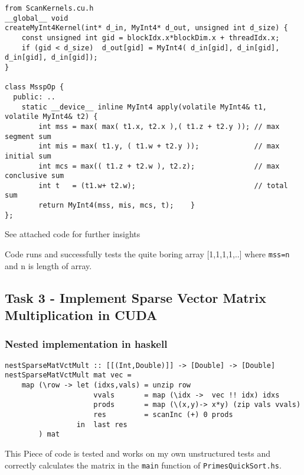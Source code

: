 \documentclass[a4paper,10pt]{article}
\begin{document}
\begin{verbatim}
from ScanKernels.cu.h
__global__ void
createMyInt4Kernel(int* d_in, MyInt4* d_out, unsigned int d_size) {
    const unsigned int gid = blockIdx.x*blockDim.x + threadIdx.x;
    if (gid < d_size)  d_out[gid] = MyInt4( d_in[gid], d_in[gid], d_in[gid], d_in[gid]);
}

class MsspOp {
  public: ..
    static __device__ inline MyInt4 apply(volatile MyInt4& t1, volatile MyInt4& t2) {
        int mss = max( max( t1.x, t2.x ),( t1.z + t2.y )); // max segment sum
        int mis = max( t1.y, ( t1.w + t2.y ));             // max initial sum
        int mcs = max(( t1.z + t2.w ), t2.z);              // max conclusive sum
        int t   = (t1.w+ t2.w);                            // total sum
        return MyInt4(mss, mis, mcs, t);    }     
};
\end{verbatim}
See attached code for further insights

Code runs and successfully tests the quite boring array [1,1,1,1,..] where \texttt{mss=n} and n is length of array.



\subsection{Task 3 - Implement Sparse Vector Matrix Multiplication in CUDA}

\subsubsection{Nested implementation in haskell}
\begin{verbatim}
nestSparseMatVctMult :: [[(Int,Double)]] -> [Double] -> [Double]
nestSparseMatVctMult mat vec =
    map (\row -> let (idxs,vals) = unzip row
                     vvals       = map (\idx ->  vec !! idx) idxs
                     prods       = map (\(x,y)-> x*y) (zip vals vvals)
                     res         = scanInc (+) 0 prods
                 in  last res
        ) mat
\end{verbatim}

This Piece of code is tested and works on my own unstructured tests and correctly calculates the matrix in the \texttt{main} function of \texttt{PrimesQuickSort.hs}.
\end{document}
